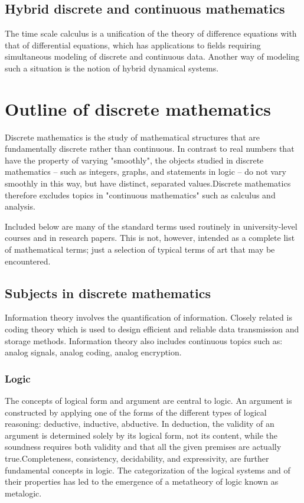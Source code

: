 \documentclass{article}
\begin{document}
\subsection{Hybrid discrete and continuous mathematics}
The time scale calculus is a unification of the theory of difference equations with that of differential equations, which has applications to fields requiring simultaneous modeling of discrete and continuous data. Another way of modeling such a situation is the notion of hybrid dynamical systems. 
\section{Outline of discrete mathematics}
Discrete mathematics is the study of mathematical structures that are fundamentally discrete rather than continuous. In contrast to real numbers that have the property of varying "smoothly", the objects studied in discrete mathematics – such as integers, graphs, and statements in logic – do not vary smoothly in this way, but have distinct, separated values.Discrete mathematics therefore excludes topics in "continuous mathematics" such as calculus and analysis.

Included below are many of the standard terms used routinely in university-level courses and in research papers. This is not, however, intended as a complete list of mathematical terms; just a selection of typical terms of art that may be encountered. 
\subsection{Subjects in discrete mathematics}
Information theory involves the quantification of information. Closely related is coding theory which is used to design efficient and reliable data transmission and storage methods. Information theory also includes continuous topics such as: analog signals, analog coding, analog encryption. 
\subsubsection{Logic}
The concepts of logical form and argument are central to logic. An argument is constructed by applying one of the forms of the different types of logical reasoning: deductive, inductive, abductive. In deduction, the validity of an argument is determined solely by its logical form, not its content, while the soundness requires both validity and that all the given premises are actually true.Completeness, consistency, decidability, and expressivity, are further fundamental concepts in logic. The categorization of the logical systems and of their properties has led to the emergence of a metatheory of logic known as metalogic.
\end{document}
